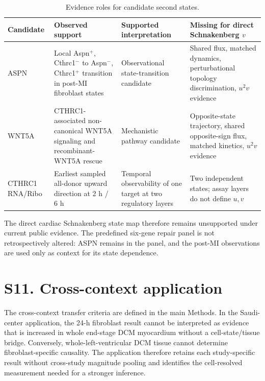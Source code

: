 \documentclass[11pt]{article}
\begin{document}
\begin{table}[H]\centering\caption{Evidence roles for candidate second states.}\label{tab:stateaudit}\scriptsize
\begin{tabularx}{\linewidth}{p{1.8cm}YYY}
\toprule \textbf{Candidate} & \textbf{Observed support} & \textbf{Supported interpretation} & \textbf{Missing for direct Schnakenberg $v$}\\\midrule
ASPN & Local Aspn$^+$, Cthrc1$^-$ to Aspn$^-$, Cthrc1$^+$ transition in post-MI fibroblast states & Observational state-transition candidate & Shared flux, matched dynamics, perturbational topology discrimination, $u^2v$ evidence\\
WNT5A & CTHRC1-associated non-canonical WNT5A signaling and recombinant-WNT5A rescue & Mechanistic pathway candidate & Opposite-state trajectory, shared opposite-sign flux, matched kinetics, $u^2v$ evidence\\
CTHRC1 RNA/Ribo & Earliest sampled all-donor upward direction at 2 h / 6 h & Temporal observability of one target at two regulatory layers & Two independent states; assay layers do not define $u,v$\\
\bottomrule\end{tabularx}\end{table}

The direct cardiac Schnakenberg state map therefore remains unsupported under current public evidence. The predefined six-gene \tgfb{} repair panel is not retrospectively altered: ASPN remains in the panel, and the post-MI observations are used only as context for its state dependence.

\section*{S11. Cross-context application}
The cross-context transfer criteria are defined in the main Methods. In the Saudi-center application, the 24-h fibroblast result cannot be interpreted as evidence that \cthrc{} is increased in whole end-stage DCM myocardium without a cell-state/tissue bridge. Conversely, whole-left-ventricular DCM tissue cannot determine fibroblast-specific \tgfb{} causality. The application therefore retains each study-specific result without cross-study magnitude pooling and identifies the cell-resolved measurement needed for a stronger inference.
\end{document}

